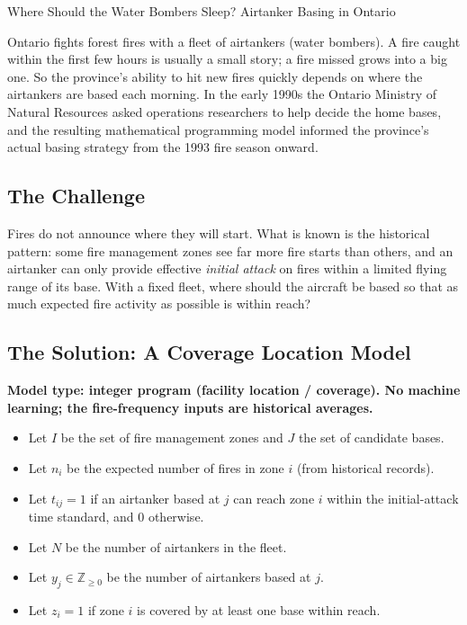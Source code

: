 \begin{casestudybox}{Where Should the Water Bombers Sleep? Airtanker Basing in Ontario}
\label{case:wildfire-airtankers}

Ontario fights forest fires with a fleet of airtankers (water bombers).  A fire caught within the first few hours is usually a small story; a fire missed grows into a big one.  So the province's ability to hit new fires quickly depends on where the airtankers are based each morning.  In the early 1990s the Ontario Ministry of Natural Resources asked operations researchers to help decide the home bases, and the resulting mathematical programming model informed the province's actual basing strategy from the 1993 fire season onward.

\subsection*{The Challenge}
Fires do not announce where they will start.  What is known is the historical pattern: some fire management zones see far more fire starts than others, and an airtanker can only provide effective \emph{initial attack} on fires within a limited flying range of its base.  With a fixed fleet, where should the aircraft be based so that as much expected fire activity as possible is within reach?

\subsection*{The Solution: A Coverage Location Model}
\textbf{Model type: integer program (facility location / coverage).  No machine learning; the fire-frequency inputs are historical averages.}

\begin{itemize}
\item Let $I$ be the set of fire management zones and $J$ the set of candidate bases.
\item Let $n_i$ be the expected number of fires in zone $i$ (from historical records).
\item Let $t_{ij} = 1$ if an airtanker based at $j$ can reach zone $i$ within the initial-attack time standard, and $0$ otherwise.
\item Let $N$ be the number of airtankers in the fleet.
\end{itemize}

\begin{itemize}
\item Let $y_j \in \mathbb{Z}_{\geq 0}$ be the number of airtankers based at $j$.
\item Let $z_i = 1$ if zone $i$ is covered by at least one base within reach.
\end{itemize}


\end{casestudybox}
